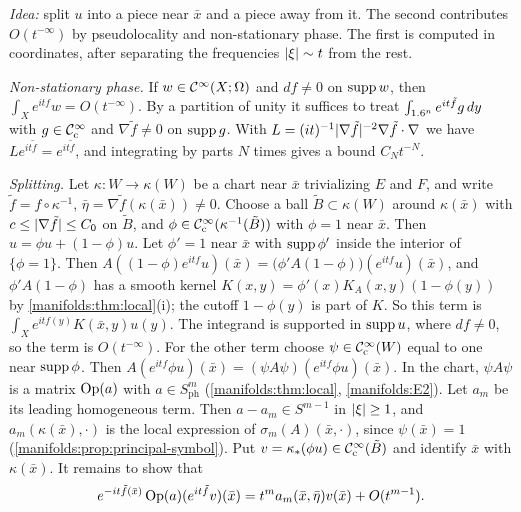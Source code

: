 \emph{Idea:} split $u$ into a piece near $\bar x$ and a piece away from it. The second
contributes $O(t^{-\infty})$ by pseudolocality and non-stationary phase. The first is
computed in coordinates, after separating the frequencies $\lvert \xi\rvert\sim t$ from the rest.

\emph{Non-stationary phase.} If $w\in\mathcal{C}^\infty(X;\Omega)$ and $df\ne0$ on $\operatorname{supp} w$, then
$\int_Xe^{itf}w=O(t^{-\infty})$. By a partition of unity it suffices to treat
$\int_{1.6^n}e^{it\tilde f}g\,dy$ with $g\in\mathcal{C}^\infty_{\mathrm{c}}$ and $\nabla\tilde f\ne0$ on $\operatorname{supp} g$. With
$L=(it)^{-1}\lvert \nabla \tilde f\rvert^{-2}\nabla\tilde f\cdot\nabla$ we have $Le^{it\tilde f}=e^{it\tilde f}$, and integrating
by parts $N$ times gives a bound $C_Nt^{-N}$.

\emph{Splitting.} Let $\kappa:W\to\kappa(W)$ be a chart near $\bar x$ trivializing $E$ and $F$,
and write $\tilde f=f\circ\kappa^{-1}$, $\bar\eta=\nabla \tilde f(\kappa(\bar x))\ne0$. Choose a ball
$\tilde B\subset\kappa(W)$ around $\kappa(\bar x)$ with $c\le\lvert \nabla \tilde f\rvert\le C_0$ on $\tilde B$, and
$\phi\in\mathcal{C}^\infty_{\mathrm{c}}(\kappa^{-1}(\tilde B))$ with $\phi=1$ near $\bar x$. Then
$u=\phi u+(1-\phi)u$. Let $\phi'=1$ near $\bar x$ with $\operatorname{supp}\phi'$ inside the interior of
$\{\phi=1\}$. Then $A((1-\phi)e^{itf}u)(\bar x)=\big(\phi'A(1-\phi)\big)(e^{itf}u)(\bar x)$, and
$\phi'A(1-\phi)$ has a smooth kernel $K(x,y)=\phi'(x)K_A(x,y)(1-\phi(y))$ by
\cref{manifolds:thm:local}(i); the cutoff $1-\phi(y)$ is part of $K$. So this term is
$\int_Xe^{itf(y)}K(\bar x,y)u(y)$. The integrand is supported in $\operatorname{supp} u$, where
$df\ne0$, so the term is $O(t^{-\infty})$. For the other term choose $\psi\in\mathcal{C}^\infty_{\mathrm{c}}(W)$ equal to one
near $\operatorname{supp}\phi$. Then $A(e^{itf}\phi u)(\bar x)=(\psi A\psi)(e^{itf}\phi u)(\bar x)$. In the chart,
$\psi A\psi$ is a matrix $\operatorname{Op}(a)$ with $a\in S^m_{\mathrm{ph}}$ (\cref{manifolds:thm:local},
\ref{manifolds:E2}). Let $a_m$ be its leading homogeneous term. Then $a-a_m\in S^{m-1}$ in
$\lvert \xi\rvert\ge1$, and $a_m(\kappa(\bar x),\cdot)$ is the local expression of $\sigma_m(A)(\bar x,\cdot)$,
since $\psi(\bar x)=1$ (\cref{manifolds:prop:principal-symbol}). Put $v=\kappa_*(\phi u)\in\mathcal{C}^\infty_{\mathrm{c}}(\tilde B)$
and identify $\bar x$ with $\kappa(\bar x)$. It remains to show that
\begin{equation}\label{solmanifolds:eq:osc-local}
e^{-it\tilde f(\bar x)}\operatorname{Op}(a)(e^{it\tilde f}v)(\bar x)=t^ma_m(\bar x,\bar\eta)v(\bar x)+O(t^{m-1}).
\end{equation}

